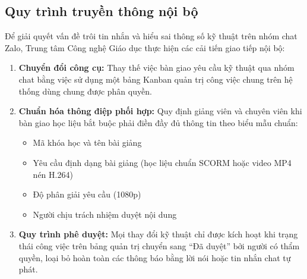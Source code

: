 \subsection{Quy trình truyền thông nội bộ}

Để giải quyết vấn đề trôi tin nhắn và hiểu sai thông số kỹ thuật trên nhóm chat Zalo, Trung tâm Công nghệ Giáo dục thực hiện các cải tiến giao tiếp nội bộ:
\begin{enumerate}
    \item \textbf{Chuyển đổi công cụ:} Thay thế việc bàn giao yêu cầu kỹ thuật qua nhóm chat bằng việc sử dụng một bảng Kanban quản trị công việc chung trên hệ thống dùng chung được phân quyền.
    \item \textbf{Chuẩn hóa thông điệp phối hợp:} Quy định giảng viên và chuyên viên khi bàn giao học liệu bắt buộc phải điền đầy đủ thông tin theo biểu mẫu chuẩn:
    \begin{itemize}
        \item Mã khóa học và tên bài giảng
        \item Yêu cầu định dạng bài giảng (học liệu chuẩn SCORM hoặc video MP4 nén H.264)
        \item Độ phân giải yêu cầu (1080p)
        \item Người chịu trách nhiệm duyệt nội dung
    \end{itemize}
    \item \textbf{Quy trình phê duyệt:} Mọi thay đổi kỹ thuật chỉ được kích hoạt khi trạng thái công việc trên bảng quản trị chuyển sang ``Đã duyệt'' bởi người có thẩm quyền, loại bỏ hoàn toàn các thông báo bằng lời nói hoặc tin nhắn chat tự phát.
\end{enumerate}
